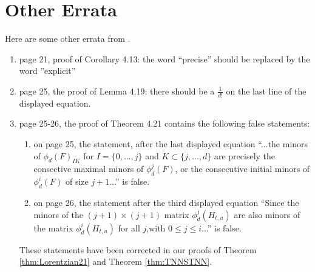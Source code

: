\documentclass[unnumsec,webpdf,modern,medium]{oup-authoring-template}
\theoremstyle{theorem}
\theoremstyle{definition}
\begin{document}
\section{Other Errata}
\label{sec:Other}
Here are some other errata from \cite{MMS}.
	\begin{enumerate}
		\item page 21, proof of Corollary 4.13: the word ``precise'' should be replaced by the word ''explicit''
		\item page 25, the proof of Lemma 4.19:  there should be a $\frac{1}{d!}$ on the last line of the displayed equation.
		\item page 25-26, the proof of Theorem 4.21 contains the following false statements:
		\begin{enumerate}
			\item on page 25, the statement, after the last displayed equation ``...the minors of $\phi_d(F)_{IK}$ for $I=\{0,...,j\}$ and $K\subset \{j,...,d\}$ are precisely the consective maximal minors of $\phi^j_d(F)$, or the consecutive initial minors of $\phi^i_d(F)$ of size $j+1$...'' is false.
			\item on page 26, the statement after the third displayed equation
			``Since the minors of the $(j+1)\times (j+1)$ matrix $\phi^j_d(H_{t,u})$ are also minors of the matrix $\phi^i_d(H_{t,u})$ for all $j$,with $0\leq j\leq i$...'' is false.
		\end{enumerate}
		These statements have been corrected in our proofs of Theorem \ref{thm:Lorentzian21} and Theorem \ref{thm:TNNSTNN}.
	\end{enumerate}
\end{document}
